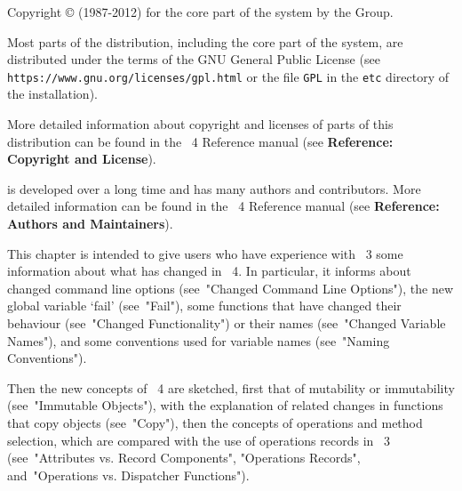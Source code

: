 
\TableOfContents
\FrontMatter
Copyright {\copyright} (1987-2012) for the core 
part of the {\GAP} system by the {\GAP} Group. 

Most parts of the {\GAP} distribution, including 
the core part of the {\GAP} system, are distributed 
under the terms of the GNU General Public License
(see {\tt{https://www.gnu.org/licenses/gpl.html}}
or the file {\tt GPL} in the {\tt etc} directory 
of the {\GAP} installation). 

More detailed information about copyright and 
licenses of parts of this distribution can be 
found in the {\GAP}~4 Reference manual 
(see {\bf Reference: Copyright and License}). 

{\GAP} is developed over a long time and has 
many authors and contributors. More detailed 
information can be found in the {\GAP}~4 
Reference manual (see {\bf Reference: Authors and Maintainers}).  

\Chapters


This chapter is intended to give users who have experience with {\GAP}~3
some information about what has changed in {\GAP}~4.
In particular, it informs about changed command line options
(see~"Changed Command Line Options"),
the new global variable `fail' (see~"Fail"),
some functions that have changed their behaviour
(see~"Changed Functionality") or their names
(see~"Changed Variable Names"),
and some conventions used for variable names (see~"Naming Conventions").

Then the new concepts of {\GAP}~4 are sketched,
first that of mutability or immutability (see~"Immutable Objects"),
with the explanation of related changes in functions that copy objects
(see~"Copy"),
then the concepts of operations and method selection, which are compared
with the use of operations records in {\GAP}~3
(see~"Attributes vs. Record Components", "Operations Records",
and~"Operations vs. Dispatcher Functions").

